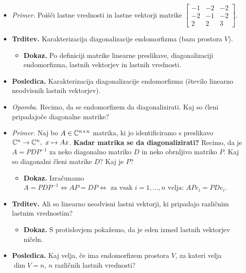 \begin{enumerate}
\begin{itemize}
\begin{itemize}
        \end{itemize}
        \item \colorbox{yellow!30}{\emph{Primer.}} Poišči lastne vrednosti in lastne vektorji matrike $\begin{bmatrix}
            -1 & -2 & -2 \\
            -2 & -1 & -2 \\
            2 & 2 & 3
        \end{bmatrix}$.
        \item \colorbox{blue!30}{\textbf{Trditev.}} Karakterizacija diagonalizacije endomorfizma (baza prostora $V$).
        \begin{itemize}
            \item \colorbox{green!30}{\textbf{Dokaz.}} Po definiciji matrike linearne preslikave, diagonalizaciji endomorfizma, lastnih vektorjev in lastnih vrednosti.
        \end{itemize}
        \item \colorbox{orange!30}{\textbf{Posledica.}} Karakterizacija diagonalizacije endomorfizma (število linearno neodvisnih lastnih vektorjev).
        \item \colorbox{yellow!30}{\emph{Opomba.}} Recimo, da se endomorfizem da diagonalizirati. Kaj so členi pripadajoče diagonalne matrike?
        \item \colorbox{yellow!30}{\emph{Primer.}} Naj bo $A \in \mathbb{C}^{n \times n}$ matrika, ki jo identificiramo s preslikavo $\mathbb{C}^n \to \mathbb{C}^n, \ x \mapsto Ax$. \textbf{Kadar matrika se da diagonalizirati?}  Recimo, da je $A = PDP^{-1}$ za neko diagonalno matriko $D$ in neko obrnljivo matriko $P$. Kaj so diagonalni členi matrike $D$? Kaj je $P$?        
        \begin{itemize}
            \item \colorbox{green!30}{\textbf{Dokaz.}} Izračunamo $A = PDP^{-1} \Leftrightarrow AP = DP \Leftrightarrow \text{ za vsak } i = 1, \ldots, n \text{ velja: } APe_i = PDe_i$.
        \end{itemize}
        \item \colorbox{blue!30}{\textbf{Trditev.}} Ali so linearno neodvisni lastni vektorji, ki pripadajo različnim lastnim vrednostim?
        \begin{itemize}
            \item \colorbox{green!30}{\textbf{Dokaz.}} S protislovjem pokažemo, da je eden izmed lastnih vektorjev ničeln.
        \end{itemize}
        \item \colorbox{orange!30}{\textbf{Posledica.}} Kaj velja, če ima endomorfizem prostora $V$, za kateri velja $\dim V = n$, $n$ različnih lastnih vrednosti?
    \end{itemize}


\end{enumerate}
